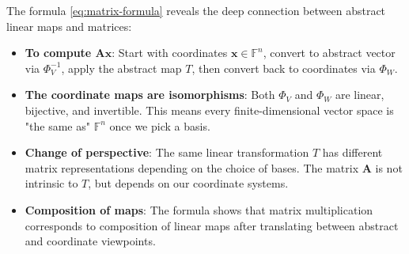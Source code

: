 \begin{remark}[Significance of the formula $\mathbf{A} = \Phi_W \circ T \circ \Phi_V^{-1}$]
  The formula \eqref{eq:matrix-formula} reveals the deep connection between abstract linear maps and matrices:
  \begin{itemize}
    \item \textbf{To compute $\mathbf{A}\mathbf{x}$}: Start with coordinates $\mathbf{x} \in \mathbb{F}^n$, convert to abstract vector via $\Phi_V^{-1}$,
          apply the abstract map $T$, then convert back to coordinates via $\Phi_W$.

    \item \textbf{The coordinate maps are isomorphisms}: Both $\Phi_V$ and $\Phi_W$ are linear, bijective, and invertible.
          This means every finite-dimensional vector space is "the same as" $\mathbb{F}^n$ once we pick a basis.

    \item \textbf{Change of perspective}: The same linear transformation $T$ has different matrix representations depending on
          the choice of bases. The matrix $\mathbf{A}$ is not intrinsic to $T$, but depends on our coordinate systems.

    \item \textbf{Composition of maps}: The formula shows that matrix multiplication corresponds to composition of linear maps
          after translating between abstract and coordinate viewpoints.
  \end{itemize}
\end{remark}

